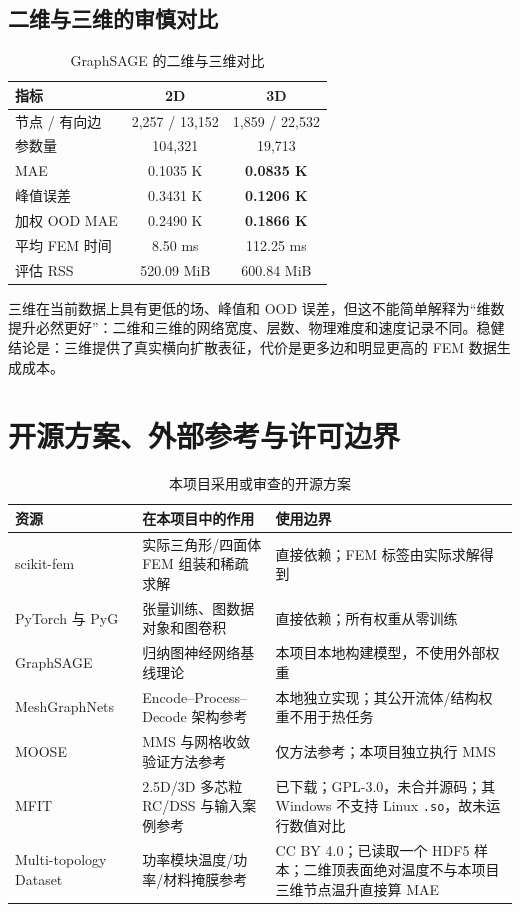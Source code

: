 \documentclass[11pt,a4paper]{article}
\newcommand{\code}[1]{\texttt{#1}}
\begin{document}
\subsection{二维与三维的审慎对比}
\begin{table}[H]
\centering
\caption{GraphSAGE 的二维与三维对比}
\label{tab:2d-3d}
\begin{tabular}{lcc}
\toprule
指标 & 2D & 3D \\
\midrule
节点 / 有向边 & 2,257 / 13,152 & 1,859 / 22,532 \\
参数量 & 104,321 & 19,713 \\
MAE & 0.1035 K & \textbf{0.0835 K} \\
峰值误差 & 0.3431 K & \textbf{0.1206 K} \\
加权 OOD MAE & 0.2490 K & \textbf{0.1866 K} \\
平均 FEM 时间 & 8.50 ms & 112.25 ms \\
评估 RSS & 520.09 MiB & 600.84 MiB \\
\bottomrule
\end{tabular}
\end{table}

三维在当前数据上具有更低的场、峰值和 OOD 误差，但这不能简单解释为“维数提升必然更好”：二维和三维的网络宽度、层数、物理难度和速度记录不同。稳健结论是：三维提供了真实横向扩散表征，代价是更多边和明显更高的 FEM 数据生成成本。

\section{开源方案、外部参考与许可边界}

\begin{table}[H]
\centering
\caption{本项目采用或审查的开源方案}
\label{tab:opensource}
\begin{tabularx}{\textwidth}{lYY}
\toprule
资源 & 在本项目中的作用 & 使用边界 \\
\midrule
scikit-fem \cite{skfem} & 实际三角形/四面体 FEM 组装和稀疏求解 & 直接依赖；FEM 标签由实际求解得到 \\
PyTorch 与 PyG \cite{pytorch,pyg} & 张量训练、图数据对象和图卷积 & 直接依赖；所有权重从零训练 \\
GraphSAGE \cite{graphsage} & 归纳图神经网络基线理论 & 本项目本地构建模型，不使用外部权重 \\
MeshGraphNets \cite{mgn} & Encode--Process--Decode 架构参考 & 本地独立实现；其公开流体/结构权重不用于热任务 \\
MOOSE \cite{moose} & MMS 与网格收敛验证方法参考 & 仅方法参考；本项目独立执行 MMS \\
MFIT \cite{mfit} & 2.5D/3D 多芯粒 RC/DSS 与输入案例参考 & 已下载；GPL-3.0，未合并源码；其 Windows 不支持 Linux \code{.so}，故未运行数值对比 \\
Multi-topology Dataset \cite{multitopology} & 功率模块温度/功率/材料掩膜参考 & CC BY 4.0；已读取一个 HDF5 样本；二维顶表面绝对温度不与本项目三维节点温升直接算 MAE \\
\bottomrule
\end{tabularx}
\end{table}
\end{document}
